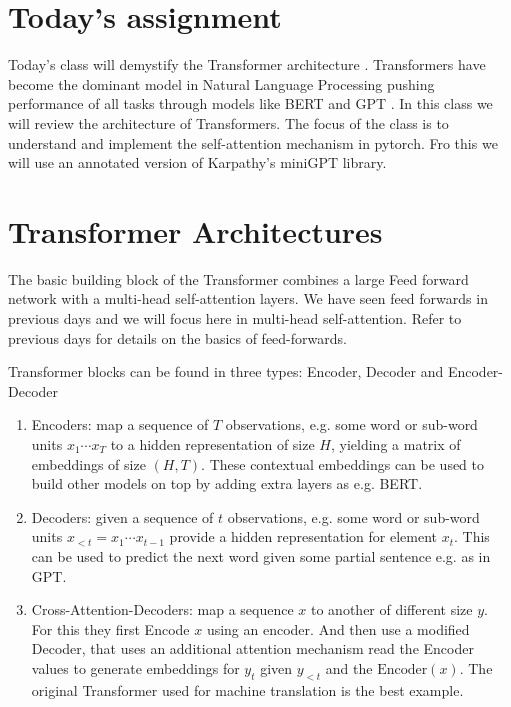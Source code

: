 \section{Today's assignment}
Today's class will demystify the Transformer architecture \cite{vaswani2017attention}. Transformers have become the dominant model in Natural Language Processing pushing performance of all tasks through models like BERT \cite{devlin2018bert} and GPT \cite{brown2020language}. In this class we will review the architecture of Transformers. The focus of the class is to understand and implement the self-attention mechanism in pytorch. Fro this we will use an annotated version of Karpathy's miniGPT library.


\section{Transformer Architectures}

The basic building block of the Transformer combines a large Feed forward network with a multi-head self-attention layers. We have seen feed forwards in previous days and we will focus here in multi-head self-attention. Refer to previous days for details on the basics of feed-forwards.

Transformer blocks can be found in three types: Encoder, Decoder and Encoder-Decoder 

\begin{enumerate}
\item Encoders: map a sequence of $T$ observations, e.g. some word or sub-word units $x_1 \cdots x_T$ to a hidden representation of size $H$, yielding a matrix of embeddings of size $(H, T)$. These contextual embeddings can be used to build other models on top by adding extra layers as e.g. BERT.
\item Decoders: given a sequence of $t$ observations, e.g. some word or sub-word units $x_{<t} = x_1 \cdots x_{t-1}$ provide a hidden representation for element $x_t$. This can be used to predict the next word given some partial sentence e.g. as in GPT. 
\item Cross-Attention-Decoders: map a sequence $x$ to another of different size $y$. For this they first Encode $x$ using an encoder. And then use a modified Decoder, that uses an additional attention mechanism read the Encoder values to generate embeddings for $y_t$ given $y_{<t}$ and the $\mathrm{Encoder}(x)$. The original Transformer used for machine translation is the best example.
\end{enumerate}

